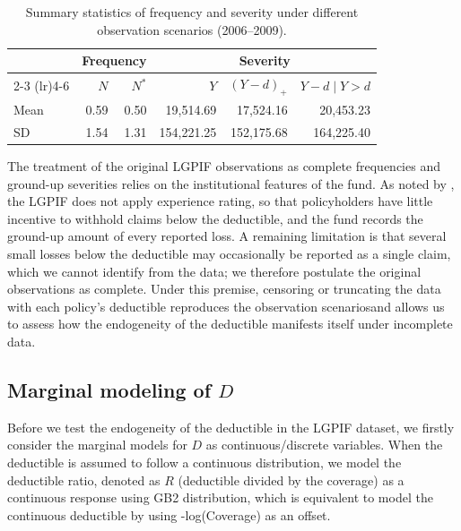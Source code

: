 
\begin{table}[h!]
\centering
\begin{tabular}{lrrrrr}
\toprule
 & \multicolumn{2}{c}{Frequency} & \multicolumn{3}{c}{Severity} \\
\cmidrule(lr){2-3}
\cmidrule(lr){4-6}
 & $N$ & $N^*$ & $Y$ & $(Y-d)_+$ & $Y-d\mid Y>d$ \\
\midrule
Mean & 0.59 & 0.50 & 19,514.69 & 17,524.16 & 20,453.23 \\
SD & 1.54 & 1.31 & 154,221.25 & 152,175.68 & 164,225.40 \\
\bottomrule
\end{tabular}
\caption{Summary statistics of frequency and severity under different observation scenarios (2006--2009).}
\label{tab:data summary}
\end{table}

{The treatment of the original LGPIF observations as complete frequencies and ground-up severities relies on the institutional features of the fund. As noted by \citet{shi2022copula}, the LGPIF does not apply experience rating, so that policyholders have little incentive to withhold claims below the deductible, and the fund records the ground-up amount of every reported loss. A remaining limitation is that several small losses below the deductible may occasionally be reported as a single claim, which we cannot identify from the data; we therefore postulate the original observations as complete. Under this premise, censoring or truncating the data with each policy's deductible reproduces the observation scenariosand allows us to assess how the endogeneity of the deductible manifests itself under incomplete data.}

\subsection{Marginal modeling of $D$}\label{section:marginalD}

Before we test the endogeneity of the deductible in the LGPIF dataset, we firstly consider the marginal models for $D$ as continuous/discrete variables. When the deductible is assumed to follow a continuous distribution, we  model the deductible ratio, denoted as $R$ (deductible divided by the coverage) as a continuous response using GB2 distribution, which is equivalent to model the continuous deductible by using -log(Coverage) as an offset. 

